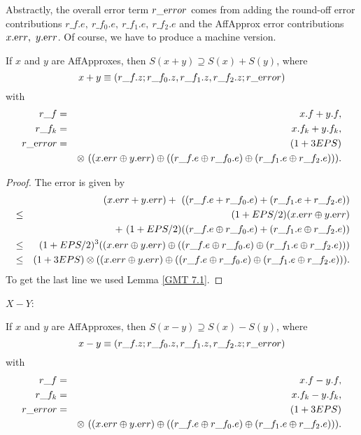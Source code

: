Abstractly, the overall error term $r\_{\textrm error}$ comes from adding the round-off error contributions $r\_f.e,\  r\_f_0.e,\  r\_f_1.e, 
\ r\_f_2.e$ and the AffApprox error contributions $x.{\textrm err},\  y.{\textrm err}$.  Of course, we have to produce a machine version.

\begin{proposition}\label{GMT 8.2} If $x$ and $y$ are 
{\textrm AffApproxes, }
then $S(x + y) \supseteq S(x) + S(y)${\textrm ,} where
$$x + y \equiv (r\_f.z; r\_f_0.z, r\_f_1.z, r\_f_2.z; r\_{\textrm error})$$
with
\begin{eqnarray*}
r\_f &=& x.f + y.f,\\
r\_f_k &=& x.f_k + y.f_k,\\
r\_{\textrm error}& =& (1 + 3EPS)\\
&&\otimes\ ((x.{\textrm err} \oplus y.{\textrm err}) \oplus ((r\_f.e \oplus
r\_f_0.e) \oplus (r\_f_1.e \oplus r\_f_2.e))).
\end{eqnarray*}
\end{proposition}

\begin{proof}{}
The error is given by 
\begin{eqnarray*}
&&\hskip-24pt (x.{\textrm err} + y.{\textrm err})  +\ ((r\_f.e + r\_f_0.e) + (r\_f_1.e + r\_f_2.e))\\
&\le& (1+EPS/2) (x.{\textrm err} \oplus
y.{\textrm err}) \\
&&+\ (1+EPS/2)((r\_f.e \oplus r\_f_0.e) + (r\_f_1.e \oplus r\_f_2.e))\\
&\le& (1+EPS/2)^3 ((x.{\textrm err} \oplus
y.{\textrm err}) \oplus ((r\_f.e \oplus r\_f_0.e) \oplus (r\_f_1.e \oplus r\_f_2.e)))\\
&\le& (1 + 3EPS) \otimes ((x.{\mathrm
err} \oplus y.{\textrm err}) \oplus ((r\_f.e \oplus r\_f_0.e) \oplus (r\_f_1.e \oplus r\_f_2.e))).
\end{eqnarray*}
 To get the last line
we used Lemma \ref{GMT 7.1}. \end{proof}

$X - Y$:

\begin{proposition}\label{GMT 8.3} If $x$ and $y$ are {\textrm AffApproxes,} then $S(x - y) \supseteq S(x) - S(y)${\textrm ,}
 where
$$x - y \equiv (r\_f.z; r\_f_0.z, r\_f_1.z, r\_f_2.z; r\_{\textrm error})$$
with
\begin{eqnarray*}
r\_f& =& x.f - y.f,\\
r\_f_k &= &x.f_k - y.f_k,\\
r\_{\textrm error} &=& (1 + 3EPS)\\
&& \otimes\ ((x.{\textrm err} \oplus y.{\textrm err}) \oplus ((r\_f.e
\oplus r\_f_0.e) \oplus (r\_f_1.e \oplus r\_f_2.e))).
\end{eqnarray*}
\end{proposition}

